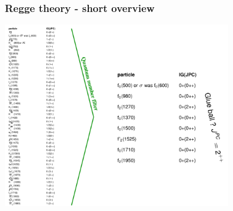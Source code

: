 \documentclass{beamer}
\begin{document}

\begin{frame}
    \frametitle{Regge theory - short overview}
    \centering\includegraphics[height=8cm, keepaspectratio]{pics/mesons_mass_range}

\end{frame}

\end{document}
